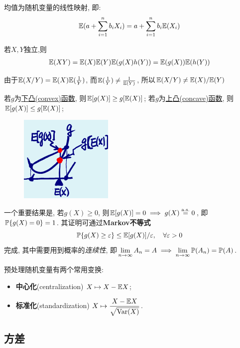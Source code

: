 \begin{theorem}
    均值为随机变量的线性映射, 即:
    \[ \E(a+\sum_{i=1}^n b_i X_i)=a+\sum_{i=1}^n b_i\E( X_i) \]
\end{theorem}

\begin{theorem}[]
    若$X,Y$独立,则
    \begin{gather*}
        \E(XY)=\E(X)\E(Y)
        \E(g(X)h(Y))=\E(g(X))\E(h(Y))
    \end{gather*}
\end{theorem}

\begin{remark}
    由于$\E(X/Y)= \E(X)\E(\frac{1}{Y})$, 而$\E(\frac{1}{Y}) \neq \frac{1}{\E(Y)}$, 所以$\E(X/Y)\neq \E(X)/\E(Y)$
\end{remark}

\begin{theorem}
    若$g$为\underline{下凸(convex)函数}, 则$\E[g(X)] \ge g[\E(X)]$; 若$g$为\underline{上凸(concave)函数}, 则$\E[g(X)] \le  g[\E(X)]$;
\end{theorem}

\begin{figure}
    \centering
    \includegraphics{image/trans_mean.png}
\end{figure}

一个重要结果是, 若$g(X) \ge 0$, 则$\E[g(X)] = 0 \implies g(X) \overset{\as}{=} 0$, 即$\P\{g(X)=0\} = 1$. 其证明可通过\textbf{Markov不等式}
\[ \P\{g(X)\ge\e\} \le \E[g(X)]/\e, \quad \forall \e > 0 \]
完成, 其中需要用到概率的\emph{连续性}, 即$\lim\limits_{n\to\infty}A_{n} = A \implies \lim\limits_{n\to\infty}\P(A_{n}) = \P(A)$.

预处理随机变量有两个常用变换:
\begin{itemize}
    \item \textbf{中心化}(centralization) $X \mapsto X-\E{X}$;
    \item \textbf{标准化}(standardization) $X \mapsto \dfrac{X-\E{X}}{\sqrt{\Var(X)}}$.
\end{itemize}

\subsection{方差}

